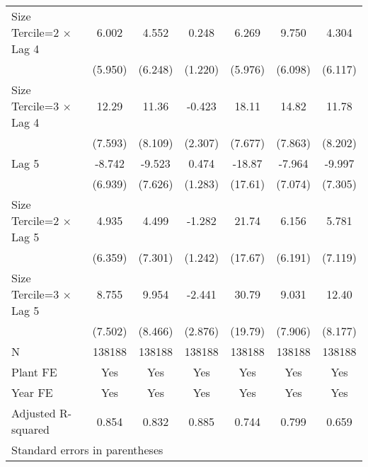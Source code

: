 \begin{table}[htbp]
\begin{tabular}{l*{6}{c}}
\addlinespace
Size Tercile=2 $\times$ Lag 4&    6.002         &    4.552         &    0.248         &    6.269         &    9.750         &    4.304         \\
                &  (5.950)         &  (6.248)         &  (1.220)         &  (5.976)         &  (6.098)         &  (6.117)         \\
\addlinespace
Size Tercile=3 $\times$ Lag 4&    12.29         &    11.36         &   -0.423         &    18.11\sym{*}  &    14.82         &    11.78         \\
                &  (7.593)         &  (8.109)         &  (2.307)         &  (7.677)         &  (7.863)         &  (8.202)         \\
\addlinespace
Lag 5           &   -8.742         &   -9.523         &    0.474         &   -18.87         &   -7.964         &   -9.997         \\
                &  (6.939)         &  (7.626)         &  (1.283)         &  (17.61)         &  (7.074)         &  (7.305)         \\
\addlinespace
Size Tercile=2 $\times$ Lag 5&    4.935         &    4.499         &   -1.282         &    21.74         &    6.156         &    5.781         \\
                &  (6.359)         &  (7.301)         &  (1.242)         &  (17.67)         &  (6.191)         &  (7.119)         \\
\addlinespace
Size Tercile=3 $\times$ Lag 5&    8.755         &    9.954         &   -2.441         &    30.79         &    9.031         &    12.40         \\
                &  (7.502)         &  (8.466)         &  (2.876)         &  (19.79)         &  (7.906)         &  (8.177)         \\
\midrule
N               &   138188         &   138188         &   138188         &   138188         &   138188         &   138188         \\
Plant FE        &      Yes         &      Yes         &      Yes         &      Yes         &      Yes         &      Yes         \\
Year FE         &      Yes         &      Yes         &      Yes         &      Yes         &      Yes         &      Yes         \\
Adjusted R-squared&    0.854         &    0.832         &    0.885         &    0.744         &    0.799         &    0.659         \\
\bottomrule
\multicolumn{7}{l}{\footnotesize Standard errors in parentheses}\\

\end{tabular}
\end{table}
